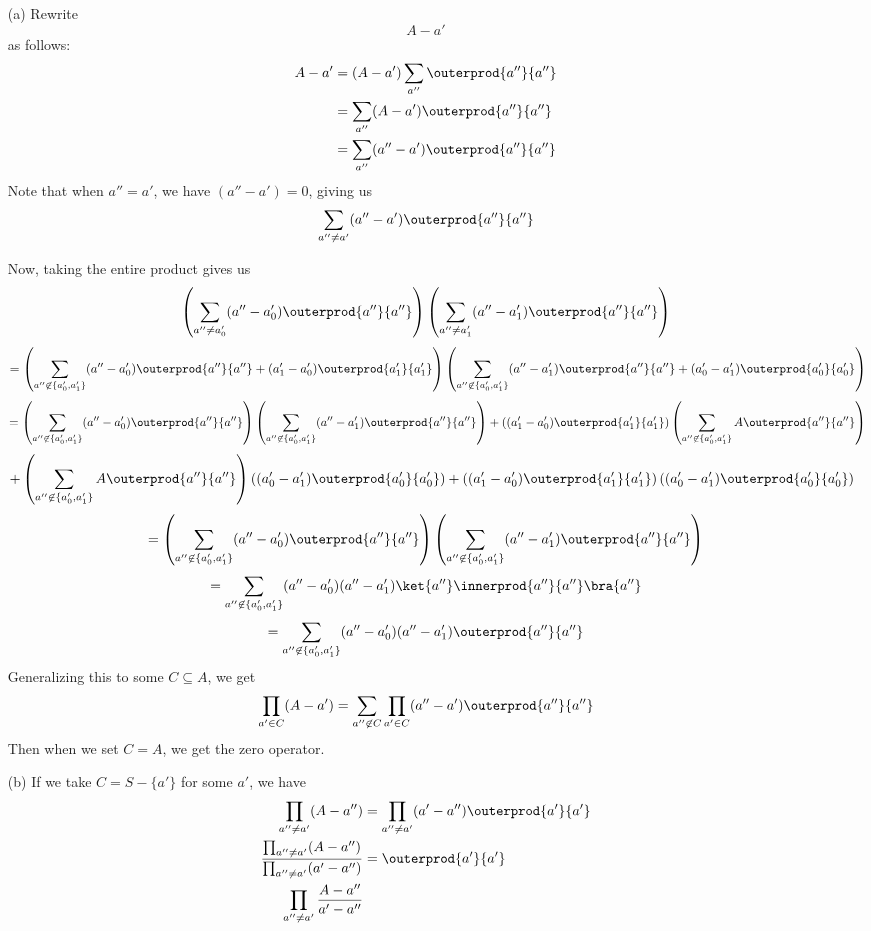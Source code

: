 \begin{itemize}
\item[(a)]
Rewrite
\[ A - a' \]
as follows:
\begin{align*}
  A - a' &= (A - a')\sum_{a''} \outerprod{a''}{a''} \\
  &= \sum_{a''} (A - a')\outerprod{a''}{a''} \\
  &= \sum_{a''} (a'' - a')\outerprod{a''}{a''}
\end{align*}
Note that when $a'' = a'$, we have $(a'' - a') = 0$, giving us
\[ \sum_{a''\neq a'} (a'' - a')\outerprod{a''}{a''} \]

Now, taking the entire product gives us
\[
\left(\sum_{a''\neq a'_0} (a'' - a'_0)\outerprod{a''}{a''}\right)
\left(\sum_{a''\neq a'_1} (a'' - a'_1)\outerprod{a''}{a''}\right)
\]
\[
=
\left(
\sum_{a''\not\in \{a'_0, a'_1\}} (a'' - a'_0)\outerprod{a''}{a''} +
(a'_1 - a'_0)\outerprod{a'_1}{a'_1}
\right)
\left(
\sum_{a''\not\in \{a'_0, a'_1\}} (a'' - a'_1)\outerprod{a''}{a''} +
(a'_0 - a'_1)\outerprod{a'_0}{a'_0}
\right)
\]
\[
=
\left(\sum_{a''\not\in \{a'_0, a'_1\}} (a'' - a'_0)\outerprod{a''}{a''}\right)
\left(\sum_{a''\not\in \{a'_0, a'_1\}} (a'' - a'_1)\outerprod{a''}{a''}\right)
+\left((a'_1 - a'_0)\outerprod{a'_1}{a'_1}\right)
\left(\sum_{a''\not\in \{a'_0, a'_1\}} A\outerprod{a''}{a''}\right)
\]
\[
+
\left(\sum_{a''\not\in \{a'_0, a'_1\}} A\outerprod{a''}{a''}\right)
\left((a'_0 - a'_1)\outerprod{a'_0}{a'_0}\right)
+\left((a'_1 - a'_0)\outerprod{a'_1}{a'_1}\right)
\left((a'_0 - a'_1)\outerprod{a'_0}{a'_0}\right)
\]
\[
=
\left(\sum_{a''\not\in \{a'_0, a'_1\}} (a'' - a'_0)\outerprod{a''}{a''}\right)
\left(\sum_{a''\not\in \{a'_0, a'_1\}} (a'' - a'_1)\outerprod{a''}{a''}\right)
\]
\[
=
\sum_{a''\not\in \{a'_0, a'_1\}} (a'' - a'_0)(a'' - a'_1)
\ket{a''}\innerprod{a''}{a''}\bra{a''}
\]
\[
=
\sum_{a''\not\in \{a'_0, a'_1\}} (a'' - a'_0)(a'' - a'_1)\outerprod{a''}{a''}
\]
Generalizing this to some $C\subseteq A$, we get
\[
\prod_{a' \in C}(A - a')
=
\sum_{a''\not\in C} \prod_{a'\in C}(a'' - a')\outerprod{a''}{a''}
\]
Then when we set $C = A$, we get the zero operator.
\item[(b)]
If we take $C = S - \{ a' \}$ for some $a'$, we have
\begin{align*}
  \prod_{a'' \neq a'} (A - a'')
  &=
  \prod_{a'' \neq a'}(a' - a'')\outerprod{a'}{a'} \\
  \frac{\prod_{a'' \neq a'} (A - a'')}{\prod_{a'' \neq a'}(a' - a'')}
  &=
  \outerprod{a'}{a'} \\
  \prod_{a'' \neq a'}\frac{A - a''}{a' - a''}
\end{align*}


\end{itemize}

